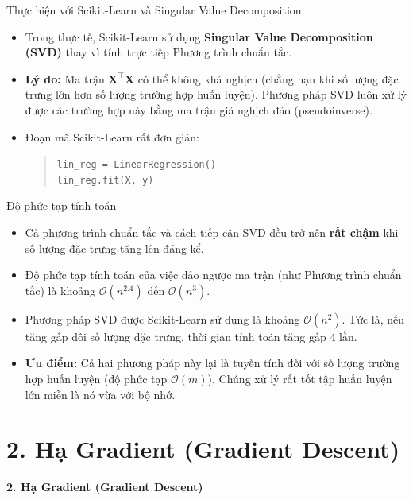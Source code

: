 \documentclass[aspectratio=169]{beamer}
\begin{document}
\begin{frame}{Thực hiện với Scikit-Learn và Singular Value Decomposition}
\begin{itemize}
    \item Trong thực tế, Scikit-Learn sử dụng \textbf{Singular Value Decomposition (SVD)} thay vì tính trực tiếp Phương trình chuẩn tắc.
    \item \textbf{Lý do:} Ma trận $\mathbf{X}^\top \mathbf{X}$ có thể không khả nghịch (chẳng hạn khi số lượng đặc trưng lớn hơn số lượng trường hợp huấn luyện). Phương pháp SVD luôn xử lý được các trường hợp này bằng ma trận giả nghịch đảo (pseudoinverse).
    \item Đoạn mã Scikit-Learn rất đơn giản:
    \begin{quote}
    \texttt{lin\_reg = LinearRegression()} \\
    \texttt{lin\_reg.fit(X, y)}
    \end{quote}
\end{itemize}
\end{frame}

\begin{frame}{Độ phức tạp tính toán}
\begin{itemize}
    \item Cả phương trình chuẩn tắc và cách tiếp cận SVD đều trở nên \textbf{rất chậm} khi số lượng đặc trưng tăng lên đáng kể.
    \item Độ phức tạp tính toán của việc đảo ngược ma trận (như Phương trình chuẩn tắc) là khoảng $\mathcal{O}(n^{2.4})$ đến $\mathcal{O}(n^3)$.
    \item Phương pháp SVD được Scikit-Learn sử dụng là khoảng $\mathcal{O}(n^2)$. Tức là, nếu tăng gấp đôi số lượng đặc trưng, thời gian tính toán tăng gấp 4 lần.
    \item \textbf{Ưu điểm:} Cả hai phương pháp này lại là tuyến tính đối với số lượng trường hợp huấn luyện (độ phức tạp $\mathcal{O}(m)$). Chúng xử lý rất tốt tập huấn luyện lớn miễn là nó vừa với bộ nhớ.
\end{itemize}
\end{frame}

\section{2. Hạ Gradient (Gradient Descent)}

\begin{frame}
\vfill\centering\LARGE\textbf{2. Hạ Gradient (Gradient Descent)}\vfill
\end{frame}
\end{document}
